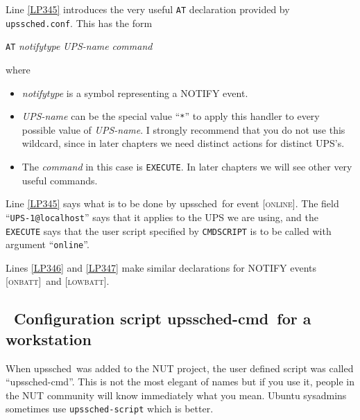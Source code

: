 \documentclass[12pt]{article}
\newlength{\headersep}\setlength{\headersep}{3mm}
\newcommand{\Hsep}{\hspace{\headersep}}
\newcommand{\upssched}{\mbox{\textcolor{SCHEDCOLOUR}{upssched}}}
\newcommand{\upsschedcmd}{\mbox{\textcolor{CMDCOLOUR}{upssched-cmd}}}
\newcommand{\ONLINE}{\textcolor{MONCOLOUR}{\textsc{online}}}
\newcommand{\ONBATT}{\textcolor{MONCOLOUR}{\textsc{onbatt}}}
\newcommand{\LOWBATT}{\textcolor{MONCOLOUR}{\textsc{lowbatt}}}
\newcommand{\NOTev}[1]{\textcolor{MONCOLOUR}{[{#1}]}}
\newcommand{\UPSi}{\texttt{UPS-1}}
\newcommand{\upsschedconf}{\textcolor{SCHEDCOLOUR}{\texttt{upssched.conf}}}
\newcommand{\ul}{\begin{itemize}%
   \setlength{\itemsep}{0em}}
\newcommand{\eul}{\end{itemize}}
\newcommand{\li}{\item}                 %
\begin{document}
Line \ref{LP345} introduces the very useful \texttt{AT} declaration provided
by \upsschedconf.  This has the form
\begin{center}
\texttt{AT} \textsl{notifytype} \textsl{UPS-name} \textsl{command}
\end{center}
\begin{flushleft}where\end{flushleft} 
\ul 

\li \textsl{notifytype} is a symbol representing a NOTIFY event.

\li \textsl{UPS-name} can be the special value ``\texttt{*}'' to apply this
handler to every possible value of \textsl{UPS-name}.  I strongly recommend
that you do not use this wildcard, since in later chapters we need distinct
actions for distinct UPS's.
 
\li The \textsl{command} in this case is \texttt{EXECUTE}.  In later chapters
we will see other very useful commands.

\eul

Line \ref{LP345} says what is to be done by \upssched\ for event
\NOTev{\ONLINE}.  The field ``\UPSi\texttt{@localhost}'' says that it applies
to the UPS we are using, and the \texttt{EXECUTE} says that the user script
specified by \texttt{CMDSCRIPT} is to be called with argument
``\texttt{online}''.

Lines \ref{LP346} and \ref{LP347} make similar declarations for NOTIFY
events \NOTev{\ONBATT}\ and \NOTev{\LOWBATT}.

\subsection{\Hsep\ Configuration script \upsschedcmd\ for a workstation}\label{section:upsschedcmd}

When \upssched\ was added to the NUT project, the user defined script was
called ``\upsschedcmd''.  This is not the most elegant of names but if you use
it, people in the NUT community will know immediately what you mean.  Ubuntu
sysadmins sometimes use \texttt{upssched{\allowbreak}-script} which is better.
\end{document}
